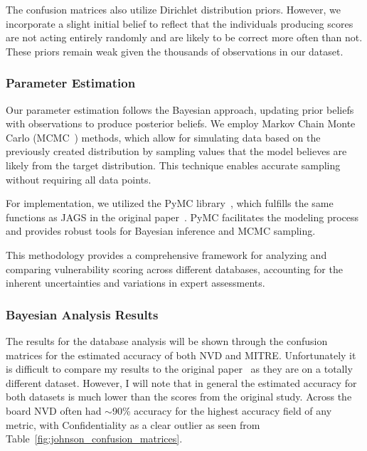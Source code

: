 \documentclass[12pt]{article}
\begin{document}
The confusion matrices also utilize Dirichlet distribution priors. However, we incorporate a slight
initial belief to reflect that the individuals producing scores are not acting entirely randomly and
are likely to be correct more often than not. These priors remain weak given the thousands of
observations in our dataset.

\subsubsection{Parameter Estimation}

Our parameter estimation follows the Bayesian approach, updating prior beliefs with observations to
produce posterior beliefs. We employ Markov Chain Monte Carlo (MCMC~\cite{mcmc}) methods, which allow for
simulating data based on the previously created distribution by sampling values that the model
believes are likely from the target distribution. This technique enables accurate sampling without
requiring all data points.

For implementation, we utilized the PyMC library~\cite{pymc}, which fulfills the same functions as
JAGS in the original paper~\cite{bayes}. PyMC facilitates the modeling process and provides robust
tools for Bayesian inference and MCMC sampling.

This methodology provides a comprehensive framework for analyzing and comparing vulnerability
scoring across different databases, accounting for the inherent uncertainties and variations in
expert assessments.


\subsubsection{Bayesian Analysis Results}

The results for the database analysis will be shown through the confusion matrices for the estimated
accuracy of both NVD and MITRE. Unfortunately it is difficult to compare my results to the original
paper~\cite{bayes} as they are on a totally different dataset. However, I will note that in general the estimated
accuracy for both datasets is much lower than the scores from the original study. Across the board NVD
often had $\sim$90\% accuracy for the highest accuracy field of any metric, with Confidentiality as
a clear outlier as seen from Table~\ref{fig:johnson_confusion_matrices}.
\end{document}
